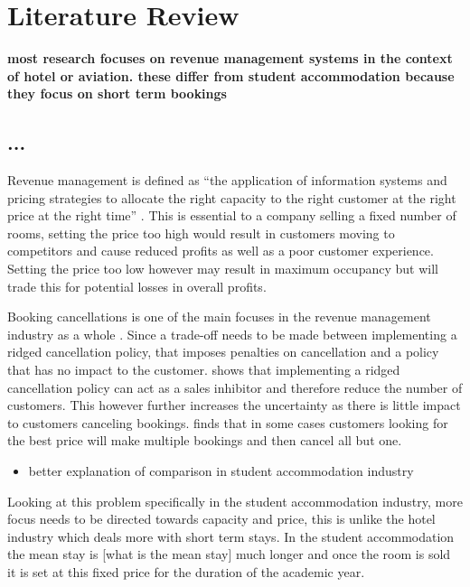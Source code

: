 \chapter{Literature Review}
\label{ch:lit_rev}

\textbf{most research focuses on revenue management systems in the context of hotel or aviation. these differ from student accommodation because they focus on short term bookings}

\section{...}
Revenue management is defined as “the application of information systems and pricing strategies to allocate the right capacity to the right customer at the right price at the right time” \cite{Kimes2003HasAcceptable}. This is essential to a company selling a fixed number of rooms, setting the price too high would result in customers moving to competitors and cause reduced profits as well as a poor customer experience. Setting the price too low however may result in maximum occupancy but will trade this for potential losses in overall profits.

\vspace{5mm}

Booking cancellations is one of the main focuses in the revenue management industry as a whole \cite{Subramanian1999AirlineNo-shows}. Since a trade-off needs to be made between implementing a ridged cancellation policy, that imposes penalties on cancellation and a policy that has no impact to the customer. \cite{Jinhong2007ServiceCancellations} shows that implementing a ridged cancellation policy can act as a sales inhibitor and therefore reduce the number of customers. This however further increases the uncertainty as there is little impact to customers canceling bookings. \cite{Talluri2004TheManagement} finds that in some cases customers looking for the best price will make multiple bookings and then cancel all but one. 

\vspace{5mm}

\begin{itemize}
\item better explanation of comparison in student accommodation industry 
\end{itemize}

Looking at this problem specifically in the student accommodation industry, more focus needs to be directed towards capacity and price, this is unlike the hotel industry which deals more with short term stays. In the student accommodation the mean stay is [what is the mean stay] much longer and once the room is sold it is set at this fixed price for the duration of the academic year.
 \vspace{5mm}
 
